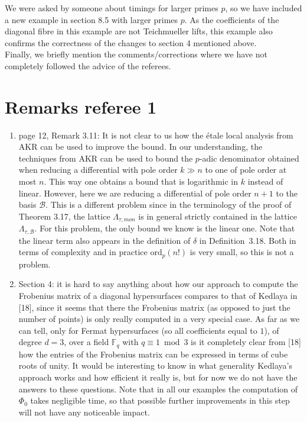 \documentclass{article}
\begin{document}
We were asked by someone about timings for larger primes $p$, so we have included a new example in section 8.5 with larger primes $p$. As the coefficients of the diagonal 
fibre in this example are not Teichmueller lifts, this example also confirms the correctness of the changes to section 4 mentioned above. \\

Finally, we briefly mention the comments/corrections where we have not completely followed the advice of the referees.

\section*{Remarks referee 1}

\begin{enumerate}
\item page 12, Remark 3.11: It is not clear to us how the \'etale local analysis from AKR can be used to improve the bound. In our understanding, the techniques from AKR can be used to
bound the $p$-adic denominator obtained when reducing a differential with pole order $k \gg n$ to one of pole order at most $n$. This way one obtains a bound that is logarithmic in $k$ instead
of linear. 
However, here we are reducing a differential of pole order $n+1$ to the basis $\mathcal{B}$. This is a different problem since in the terminology of the proof of Theorem 3.17, the
lattice $\Lambda_{\tau,mon}$ is in general strictly contained in the lattice $\Lambda_{\tau,\mathcal{B}}$. For this problem, the only bound we know is the linear one. Note that  
the linear term also appears in the definition of $\delta$ in Definition~3.18. Both in terms of complexity and in practice $\mbox{ord}_p(n!)$ is very small, so this is not a problem.
\item Section 4: it is hard to say anything about how our approach to compute the Frobenius matrix of a diagonal hypersurfaces compares to that of Kedlaya in [18], since it seems that there the
Frobenius matrix (as opposed to just the number of points) is only really computed in a very special case. As far as we can tell, only for Fermat hypersurfaces (so all coefficients equal 
to $1$), of degree $d=3$, over a field $\mathbb{F}_q$ with $q \equiv 1 \bmod{3}$ is it completely clear from [18] how the entries of the Frobenius matrix can be expressed in terms of cube 
roots of unity. It would be interesting to know in what generality Kedlaya's approach works and how efficient it really is, but for now we do not have the answers to these questions. Note that in all
our examples the computation of $\Phi_0$ takes negligible time, so that possible further improvements in this step will not have any noticeable impact.
\end{enumerate}
\end{document}
